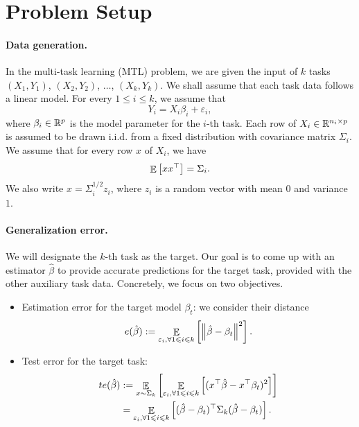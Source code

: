 \section{Problem Setup}\label{sec_setup}

\paragraph{Data generation.}
In the multi-task learning (MTL) problem, we are given the input of $k$ tasks $(X_1, Y_1)$, $(X_2, Y_2)$, $\dots$, $(X_k, Y_k)$.
We shall assume that each task data follows a linear model.
For every $1\le i\le k$, we assume that
\[ Y_i = X_i \beta_i + \varepsilon_i, \]
where $\beta_i\in\mathbb{R}^p$ is the model parameter for the $i$-th task.
Each row of $X_i\in\mathbb{R}^{n_i\times p}$ is assumed to be drawn i.i.d. from a fixed distribution with covariance matrix $\Sigma_i$.
We assume that for every row $x$ of $X_i$, we have
\[ \mathop{\mathbb{E}}\left[ xx^{\top} \right] = \Sigma_i. \]
We also write $x = \Sigma_i^{1/2} z_i$, where $z_i$ is a random vector with mean $0$ and variance $1$.


\paragraph{Generalization error.}
We will designate the $k$-th task as the target.
Our goal is to come up with an estimator $\hat{\beta}$ to provide accurate predictions for the target task, provided with the other auxiliary task data.
Concretely, we focus on two objectives.
\begin{itemize}
	\item Estimation error for the target model $\beta_t$: we consider their distance
		\[ e(\hat{\beta}) := \mathop{\mathbb{E}}_{\varepsilon_i, \forall 1\leqslant i\leqslant k}\left[ \left\| \hat{\beta} - \beta_t \right\|^2 \right]. \]
	\item Test error for the target task:
		\begin{align*}
			te(\hat{\beta}) &:= \mathop{\mathbb{E}}_{x \sim \Sigma_k}\left[ \mathop{\mathbb{E}}_{{\varepsilon_i, \forall 1\leqslant i\leqslant k}}\left[ (x^{\top}\hat{\beta} - x^{\top}\beta_t)^2 \right] \right] \\
			&= \mathop{\mathbb{E}}_{\varepsilon_i, \forall 1\leqslant i\leqslant k}\left[ (\hat{\beta} - \beta_t)^{\top}\Sigma_k(\hat{\beta} - \beta_t) \right].
		\end{align*}
\end{itemize}

